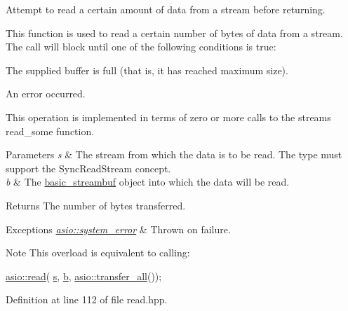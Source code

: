 Attempt to read a certain amount of data from a stream before returning. 

This function is used to read a certain number of bytes of data from a stream. The call will block until one of the following conditions is true\+:

\begin{DoxyItemize}
\item The supplied buffer is full (that is, it has reached maximum size).\end{DoxyItemize}
\begin{DoxyItemize}
\item An error occurred.\end{DoxyItemize}
This operation is implemented in terms of zero or more calls to the stream\textquotesingle{}s read\+\_\+some function.


\begin{DoxyParams}{Parameters}
{\em s} & The stream from which the data is to be read. The type must support the Sync\+Read\+Stream concept.\\
\hline
{\em b} & The \hyperlink{classasio_1_1basic__streambuf}{basic\+\_\+streambuf} object into which the data will be read.\\
\hline
\end{DoxyParams}
\begin{DoxyReturn}{Returns}
The number of bytes transferred.
\end{DoxyReturn}

\begin{DoxyExceptions}{Exceptions}
{\em \hyperlink{classasio_1_1system__error}{asio\+::system\+\_\+error}} & Thrown on failure.\\
\hline
\end{DoxyExceptions}
\begin{DoxyNote}{Note}
This overload is equivalent to calling\+: 
\begin{DoxyCode}
\hyperlink{group__read_ga68b2bc31177c2bf7cba974b5c65f9036}{asio::read}(
   \hyperlink{group__async__connect_ga31ab74b9ea6c77932dddd016cfc7920a}{s}, \hyperlink{group__async__read_ga945a5c18fa77a9e2eba420f8f44b2a4f}{b},
   \hyperlink{group__completion__condition_ga4a82e92df79aa8401a8bc2117d4cf900}{asio::transfer\_all}()); 
\end{DoxyCode}
 
\end{DoxyNote}


Definition at line 112 of file read.\+hpp.

\hypertarget{group__read_gabc0bc3183df1291c7b2a35ec30d5428c}{}
